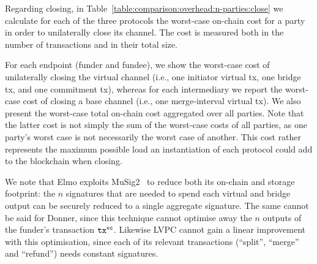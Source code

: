 %


  Regarding closing,
%
  in Table~\ref{table:comparison:overhead:n-parties:close} we
  calculate for each of the three protocols the worst-case on-chain cost for a party
  in order to unilaterally close its channel. The cost is
  measured both in the number of transactions and in their total size.

  For each endpoint (funder and fundee), we show the worst-case cost of unilaterally
  closing the virtual channel (i.e., one initiator virtual tx, one bridge tx,
  and one commitment tx), whereas for each intermediary we
  report the worst-case cost of closing a base channel (i.e., one merge-interval
  virtual tx). We also present the worst-case
  total on-chain cost
  aggregated over all parties. Note that the latter cost is not simply the sum
  of the worst-case costs of all parties, as one party's worst case is not
  necessarily the worst case of another. This cost rather represents the maximum
  possible load an instantiation of each protocol could add to the blockchain
  when closing.

  We note that Elmo exploits
  MuSig2~\cite{DBLP:journals/dcc/MaxwellPSW19,DBLP:conf/crypto/NickRS21} to
  reduce both its
  on-chain and storage footprint: the $n$ signatures that are needed to spend
  each virtual and bridge output can be securely reduced to a single aggregate
  signature. The same cannot be said for
  Donner, since this technique cannot optimise away the $n$ outputs of the
  funder's transaction $\texttt{tx}^{\mathtt{vc}}$. Likewise LVPC cannot gain a linear
  improvement with this optimisation, since each of its relevant transactions
  (``split'', ``merge'' and ``refund'') needs constant signatures.

